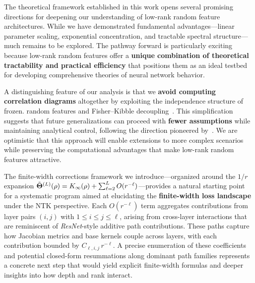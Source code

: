 The theoretical framework established in this work opens several promising directions for deepening our understanding of low-rank random feature architectures. 
While we have demonstrated fundamental advantages—linear parameter scaling, exponential concentration, and tractable spectral structure—much remains to be explored. The pathway forward is particularly exciting because low-rank random features offer a \textbf{unique combination of theoretical tractability and practical efficiency} that positions them as an ideal testbed for developing comprehensive theories of neural network behavior.

A distinguishing feature of our analysis is that we \textbf{avoid computing correlation diagrams} altogether by exploiting the independence structure of frozen.
 random features and Fisher–Kibble decoupling~\cite{fisher1915probable,hotelli
 ng1953new}. This simplification suggests that future generalizations can proceed with \textbf{fewer assumptions} while maintaining analytical control, following the 
 direction pioneered by~\cite{benigni2025eigenvaluedistributionneuraltangent}. We are optimistic that this approach will enable extensions to more complex scenarios 
 while preserving the computational advantages that make low-rank random features attractive.


The finite-width corrections framework we introduce—organized around the \( 1/r \) expansion \( \tilde{\boldsymbol{\Theta}}^{(L)}(\rho) = K_\infty(\rho) + 
\sum_{\ell=2}^{L} O(r^{-\ell}) \)—provides a natural starting point for a systematic program aimed at elucidating the \textbf{finite-width loss landscape} 
under the NTK perspective. Each \( O(r^{-\ell}) \) term aggregates contributions from layer pairs \( (i,j) \) with \( 1 \le i \le j \le \ell \), arising 
from cross-layer interactions that are reminiscent of \emph{ResNet}-style additive path contributions. These paths capture how Jacobian metrics and base 
kernels couple across layers, with each contribution bounded by \( C_{\ell,i,j}\, r^{-\ell} \). A precise enumeration of these coefficients and potential 
closed-form resummations along dominant path families represents a concrete next step that would yield explicit finite-width formulas and deeper insights 
into how depth and rank interact.

